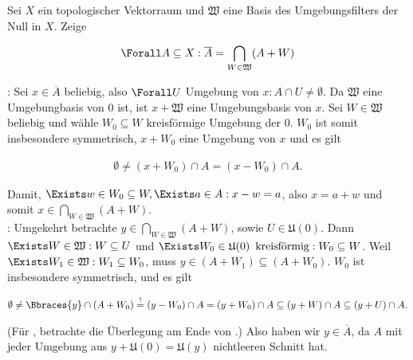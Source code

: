 \begin{exercise}

Sei $X$ ein topologischer Vektorraum und $\mathfrak{W}$ eine Basis des Umgebungsfilters der Null in $X$.
Zeige

\begin{align*}
  \Forall A \subseteq X:
  \overline{A}
  =
  \bigcap_{W \in \mathfrak{W}} (A + W)
\end{align*}

\end{exercise}

\begin{solution}

\Quote{$\subseteq$}:
Sei $x \in \overline{A}$ beliebig, also $\Forall U$ Umgebung von $x: A \cap U \neq \emptyset$.
Da $\mathfrak{W}$ eine Umgebungbasis von $0$ ist, ist $x + \mathfrak{W}$ eine Umgebungsbasis von $x$.
Sei $W \in \mathfrak{W}$ beliebig und wähle $W_0 \subseteq W$ kreisförmige Umgebung der $0$.
$W_0$ ist somit insbesondere symmetrisch, $x + W_0$ eine Umgebung von $x$ und es gilt

\begin{align*}
  \emptyset
  \neq
  (x + W_0) \cap A
  =
  (x - W_0) \cap A.
\end{align*}

Damit, $\Exists w \in W_0 \subseteq W, \Exists a \in A: x - w = a$, also $x = a + w$ und somit $x \in \bigcap_{W \in \mathfrak{W}}(A + W)$. \\

\Quote{$\supseteq$}:
Umgekehrt betrachte $y \in \bigcap_{W \in \mathfrak{W}}(A + W)$, sowie $ U \in \mathfrak{U}(0)$.
Dann $\Exists W \in \mathfrak{W}: W \subseteq U$ und $\Exists W_0 \in \mathfrak{U}(0) \enspace \text{kreisförmig}: W_0 \subseteq W$.
Weil $\Exists W_1 \in \mathfrak{W}: W_1 \subseteq W_0$, muss $y \in (A + W_1) \subseteq (A + W_0)$.
$W_0$ ist insbesondere symmetrisch, und es gilt

\begin{align*}
  \emptyset
  \neq
  \Bbraces{y} \cap (A + W_0)
  \stackrel{!}{=}
  (y - W_0) \cap A = (y + W_0) \cap A
  \subseteq
  (y + W) \cap A
  \subseteq
  (y + U) \cap A.
\end{align*}

(Für \Quote{!}, betrachte die Überlegung am Ende von \Quote{$\subseteq$}.)
Also haben wir $y \in \overline{A}$, da $A$ mit jeder Umgebung aus $y + \mathfrak{U}(0) = \mathfrak{U}(y)$ nichtleeren Schnitt hat.

\end{solution}
